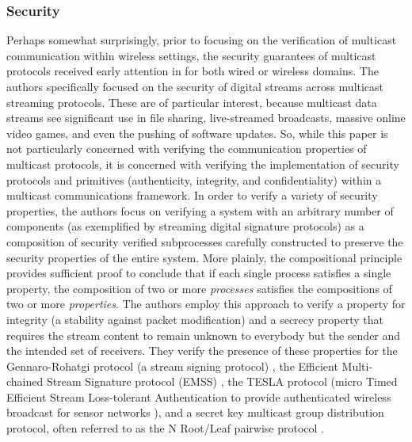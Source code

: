 \documentclass[11pt, journal]{IEEEtran}
\begin{document}
\subsubsection{Security}
Perhaps somewhat surprisingly, prior to focusing on the verification of multicast communication within wireless settings, the security guarantees of multicast protocols received early attention in \cite{Gorrieri2008} for both wired or wireless domains. The authors specifically focused on the security of digital streams across multicast streaming protocols. These are of particular interest, because multicast data streams see significant use in file sharing, live-streamed broadcasts, massive online video games, and even the pushing of software updates. So, while this paper is not particularly concerned with verifying the communication properties of multicast protocols, it is concerned with verifying the implementation of security protocols and primitives (authenticity, integrity, and confidentiality) within a multicast communications framework. 
\bigbreak
In order to verify a variety of security properties, the authors focus on verifying a system with an arbitrary number of components (as exemplified by streaming digital signature protocols) as a composition of security verified subprocesses carefully constructed to preserve the security properties of the entire system. More plainly, the compositional principle provides sufficient proof to conclude that if each single process satisfies a single property, the composition of two or more \textit{processes} satisfies the compositions of two or more \textit{properties}. The authors employ this approach to verify a property for integrity (a stability against packet modification) and a secrecy property that requires the stream content to remain unknown to everybody but the sender and the intended set of receivers. They verify the presence of these properties for the Gennaro-Rohatgi protocol (a stream signing protocol) \cite{Gennaro2001}, the Efficient Multi-chained Stream Signature protocol (EMSS) \cite{Perrig2000}, the \textmugreek TESLA protocol (micro Timed Efficient Stream Loss-tolerant Authentication to provide authenticated wireless broadcast for sensor networks \cite{Perrig2002}), and a secret key multicast group distribution protocol, often referred to as the N Root/Leaf pairwise protocol \cite{rfc2627}.
\bigbreak
\end{document}
